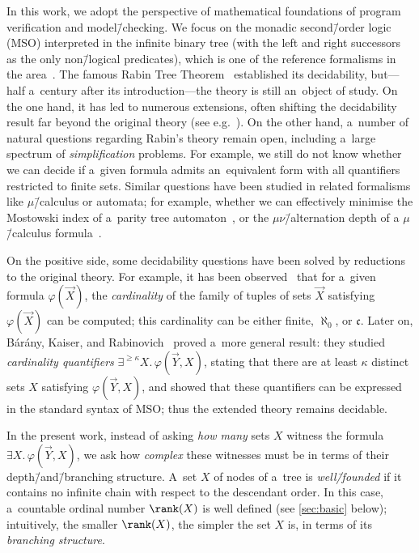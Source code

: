 \documentclass{lmcs}
\numberwithin{equation}{section}
\numberwithin{figure}{section}
\begin{document}
In this work, we adopt the perspective of mathematical foundations of program verification and model\=/checking.
We focus on the monadic second\=/order logic (MSO) interpreted in the
infinite binary tree (with the left and right successors as the only
non\=/logical predicates), which is one of the reference formalisms in the area~\cite{thomas_languages}.
The famous Rabin Tree Theorem~\cite{rabin_s2s} established its decidability, but---half a~century after its introduction---the theory is still an~object of study.
On the one hand, it has led to numerous extensions, often shifting the decidability result far beyond the original theory (see e.g.~\cite{bojanczyk_wmso_u_p,ong_model_checking_higher_order}).
On the other hand, a~number of natural questions regarding Rabin's theory remain open, including a~large spectrum of \emph{simplification} problems.
For example, we still do not know whether we can decide if a~given formula admits an~equivalent form with all quantifiers restricted to finite sets.
Similar questions have been studied in related formalisms like $\mu$\=/calculus or automata;
for example, whether we can effectively minimise the Mostowski index of a~parity tree automaton~\cite{loding_index_to_bounds,murlak_game_auto},
or the $\mu \nu $\=/alternation depth of a $\mu$\=/calculus formula~\cite{bradfield_simplifying}.

On the positive side, some decidability questions have been solved by reductions to the original theory.
For example, it has been observed~\cite{niwinski_cardinality} that for a~given formula $\varphi(\vec{X})$,
the \emph{cardinality} of the family of tuples of sets $\vec{X}$ satisfying $\varphi(\vec{X})$ can be computed;
this cardinality can be either finite, $\aleph_0$, or $\mathfrak c$.
Later on, B\'ar\'any, Kaiser, and Rabinovich~\cite{barany_expressing_trees} proved a~more general result: they studied \emph{cardinality quantifiers} $\exists^{\geq \kappa} X.\, \varphi(\vec{Y}, X)$,
stating that there are at least $\kappa$ distinct sets $X$ satisfying $\varphi(\vec{Y}, X)$, and showed that these quantifiers can be expressed in the standard syntax of MSO;
thus the extended theory remains decidable.

In the present work, instead of asking \emph{how many} sets $X$ witness the formula $\exists X.\, \varphi(\vec{Y},X)$,
we ask how \emph{complex} these witnesses must be in terms of their depth\=/and\=/branching structure.
A~set $X$ of nodes of a~tree is \emph{well\=/founded} if it contains no infinite chain with respect to the descendant order.
In this case, a~countable ordinal number $\rank(X)$ is well defined (see \cref{sec:basic} below);
intuitively, the smaller $\rank(X)$, the simpler the set $X$ is, in terms of its \emph{branching structure}.
\end{document}
